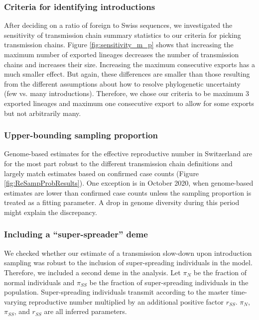\documentclass[9pt,twoside,lineno]{pnas-new}
\begin{document}
\subsubsection{Criteria for identifying introductions}
After deciding on a ratio of foreign to Swiss sequences, we investigated the sensitivity of transmission chain summary statistics to our criteria for picking transmission chains. Figure \ref{fig:sensitivity_m_p} shows that increasing the maximum number of exported lineages decreases the number of transmission chains and increases their size. Increasing the maximum consecutive exports has a much smaller effect. But again, these differences are smaller than those resulting from the different assumptions about how to resolve phylogenetic uncertainty (few vs. many introductions). Therefore, we chose our criteria to be maximum 3 exported lineages and maximum one consecutive export to allow for some exports but not arbitrarily many. 

\subsubsection{Upper-bounding sampling proportion}
Genome-based estimates for the effective reproductive number in Switzerland are for the most part robust to the different transmission chain definitions and largely match estimates based on confirmed case counts (Figure \ref{fig:ReSampProbResults}). One exception is in October 2020, when genome-based estimates are lower than confirmed case counts unless the sampling proportion is treated as a fitting parameter. A drop in genome diversity during this period might explain the discrepancy. 

\subsubsection{Including a ``super-spreader'' deme}
We checked whether our estimate of a transmission slow-down upon introduction sampling was robust to the inclusion of super-spreading individuals in the model. Therefore, we included a second deme in the analysis. Let $\pi_N$ be the fraction of normal individuals and $\pi_{SS}$ be the fraction of super-spreading individuals in the population. Super-spreading individuals transmit according to the master time-varying reproductive number multiplied by an additional positive factor $r_{SS}$. $\pi_N$, $\pi_{SS}$, and $r_{SS}$ are all inferred parameters. 
\end{document}

